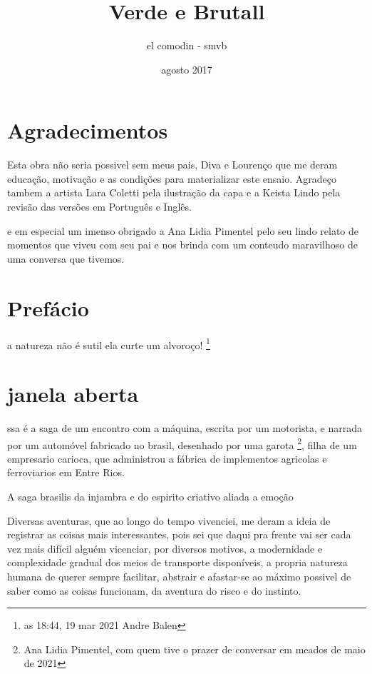\documentclass[a4paper]{report}
\title{Verde e Brutall}
\author{el comodin - smvb}
\date{agosto 2017}
\begin{document}
 
\maketitle
 
\tableofcontents

\clearpage

\section*{Agradecimentos}

Esta obra n\~ao seria possivel sem meus pais, Diva e Louren\c{c}o que me deram educa\c{c}\~ao, motiva\c{c}\~ao e as condi\c{c}\~oes para materializar este ensaio.
Agrade\c{c}o tambem a artista Lara Coletti pela ilustra\c{c}\~ao da capa e a Keista Lindo pela revis\~ao das vers\~oes em Portugu\^es e Ingl\^es.

e em especial um imenso obrigado a Ana Lidia Pimentel pelo seu lindo relato de momentos que viveu com seu pai e nos brinda com um conteudo maravilhoso de uma conversa que tivemos.  


\clearpage

\section*{Pref\'acio}


a natureza n\~ao \'e sutil
ela curte um alvoro\c{c}o! \footnote{ as 18:44, 19 mar 2021 Andre Balen } 


\clearpage


\section*{janela aberta}

\lettrine[findent=2pt]{}{ }ssa \'e a saga de um encontro com a m\'aquina, escrita por um motorista, e narrada por um autom\'ovel 
fabricado no brasil, desenhado por uma garota \footnote{Ana Lidia Pimentel, com quem tive o prazer de conversar em meados de maio de 2021}, filha de um empresario carioca, que administrou a f\'abrica de
 implementos agricolas e ferroviarios em Entre Rios.

A saga brasilis da injambra e do espirito criativo aliada a emo\c{c}\~ao

Diversas aventuras, que ao longo do tempo vivenciei, me deram a ideia de 
registrar as coisas mais interessantes, pois sei que daqui pra frente vai ser cada vez mais dif\'icil algu\'em vicenciar, por diversos motivos, a modernidade e complexidade gradual dos meios de transporte dispon\'iveis, a propria
natureza humana de querer sempre facilitar, abstrair e afastar-se ao m\'aximo possivel de saber como as coisas funcionam, da aventura do risco e do instinto.
\end{document}
